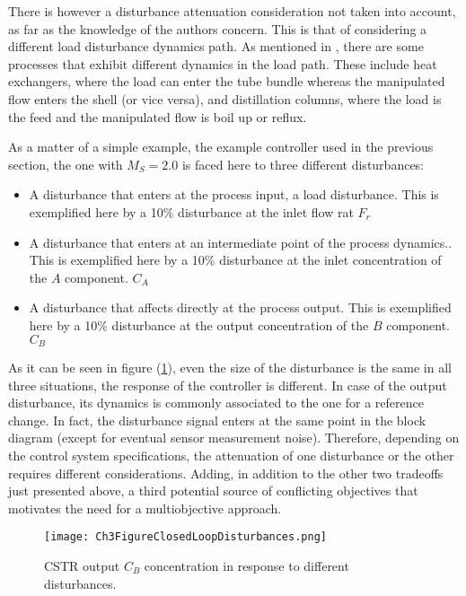 There is however a disturbance attenuation consideration not taken into account, as far as the knowledge of the authors concern. This is that of considering a different load disturbance dynamics path. As mentioned in \cite{Shinskey2002}, there are some processes that exhibit different dynamics in the load path. These include heat exchangers, where the load can enter the tube bundle whereas the manipulated flow enters the shell (or vice versa), and distillation columns, where the load is the feed and the manipulated flow is boil up or reflux.

As a matter of a simple example, the example controller used in the previous section, the one with $M_S=2.0$ is faced here to three different disturbances:

\begin{itemize}
\item A disturbance that  enters at the process input, a load disturbance. This is exemplified here by a 10\% disturbance at the inlet flow rat $F_r$ 
\item A disturbance that enters at  an intermediate point of the process dynamics.. This is exemplified here by a 10\% disturbance at the inlet concentration of the $A$ component. $C_A$
\item A disturbance that affects directly at the process output. This is exemplified here by a 10\% disturbance at the output concentration of the $B$ component. $C_B$
 \end{itemize} 

As it can be seen in figure (\ref{ch3:fig:Ch3FigureClosedLoopDisturbances}), even the size of the disturbance is the same in all three situations, the response of the controller is different. In case of the output disturbance, its dynamics is commonly associated to the one for a reference change. In fact, the disturbance signal enters at the same point in the block diagram (except for eventual sensor measurement noise). Therefore, depending on the control system specifications, the attenuation of one disturbance or the other requires different considerations. Adding, in addition to the other two tradeoffs just presented above, a third potential source of conflicting objectives that motivates the need for a multiobjective approach.


\begin{figure}[tb]
    \begin{center}
        \texttt{[image: Ch3FigureClosedLoopDisturbances.png]}
        \caption{CSTR output $C_B$ concentration in response to different disturbances.}
        \label{ch3:fig:Ch3FigureClosedLoopDisturbances}
    \end{center}
\end{figure}



